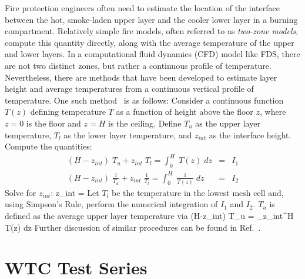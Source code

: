 Fire protection engineers often need to estimate the location of the
interface between the hot, smoke-laden upper layer and the cooler
lower layer in a burning compartment.  Relatively simple fire models,
often referred to as {\em two-zone models}, compute this quantity
directly, along with the average temperature of the upper and lower
layers.  In a computational fluid dynamics (CFD) model like FDS, there
are not two distinct zones, but rather a continuous profile of
temperature. Nevertheless, there are methods that have been developed
to estimate layer height and average temperatures from a continuous
vertical profile of temperature. One such
method~\cite{Janssens:JFS1992} is as follows: Consider a continuous
function $T(z)$ defining temperature $T$ as a function of height above
the floor $z$, where $z=0$ is the floor and $z=H$ is the
ceiling. Define $T_u$ as the upper layer temperature, $T_l$ as the
lower layer temperature, and $z_{int}$ as the interface
height. Compute the quantities:
\begin{eqnarray*} (H-z_{int})\; T_u + z_{int} \; T_l = \int_0^H \; T(z) \; dz &=& I_1 \\
                  (H-z_{int})\; \frac{1}{T_u} + z_{int} \; \frac{1}{T_l} = \int_0^H \; \frac{1}{T(z)} \; dz &=& I_2 \end{eqnarray*}
Solve for $z_{int}$:
\be z_{int} =  \ee
Let $T_l$ be the temperature in the lowest mesh cell and, using
Simpson's Rule, perform the numerical integration of $I_1$ and
$I_2$. $T_u$ is defined as the average upper layer temperature via
\be (H-z_{int})\; T_u = \int_{z_{int}}^H \; T(z) \; dz \ee
Further discussion of similar procedures can be found in Ref.~\cite{He:1}.

\section{WTC Test Series}


